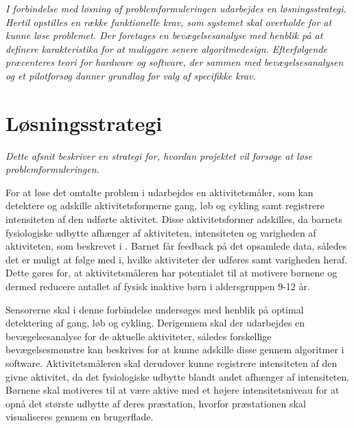 \textit{I forbindelse med løsning af problemformuleringen udarbejdes en løsningsstrategi. Hertil opstilles en række funktionelle krav, som systemet skal overholde for at kunne løse problemet. Der foretages en bevægelsesanalyse med henblik på at definere karakteristika for at muliggøre senere algoritmedesign. Efterfølgende præcenteres teori for hardware og software, der sammen med bevægelsesanalysen og et pilotforsøg danner grundlag for valg af specifikke krav.}

\section{Løsningsstrategi}
\textit{Dette afsnit beskriver en strategi for, hvordan projektet vil forsøge at løse problemformuleringen.}

For at løse det omtalte problem i  udarbejdes en aktivitetsmåler, som kan detektere og adskille aktivitetsformerne gang, løb og cykling samt registrere intensiteten af den udførte aktivitet. Disse aktivitetsformer adskilles, da barnets fysiologiske udbytte afhænger af aktiviteten, intensiteten og varigheden af aktiviteten, som beskrevet i . Barnet får feedback på det opsamlede data, således det er muligt at følge med i, hvilke aktiviteter der udføres samt varigheden heraf. Dette gøres for, at aktivitetsmåleren har potentialet til at motivere børnene og dermed reducere antallet af fysisk inaktive børn i aldersgruppen 9-12 år.

Sensorerne skal i denne forbindelse undersøges med henblik på optimal detektering af gang, løb og cykling. Derigennem skal der udarbejdes en bevægelsesanalyse for de aktuelle aktiviteter, således forskellige bevægelsesmønstre kan beskrives for at kunne adskille disse gennem algoritmer i software. Aktivitetsmåleren skal derudover kunne registrere intensiteten af den givne aktivitet, da det fysiologiske udbytte blandt andet afhænger af intensiteten. Børnene skal motiveres til at være aktive med et højere intensitetsniveau for at opnå det største udbytte af deres præstation, hvorfor præstationen skal visualiseres gennem en brugerflade.%


